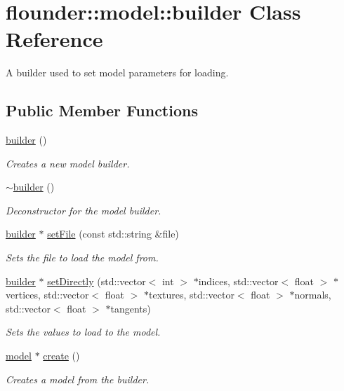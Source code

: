 \hypertarget{classflounder_1_1model_1_1builder}{}\section{flounder\+:\+:model\+:\+:builder Class Reference}
\label{classflounder_1_1model_1_1builder}


A builder used to set model parameters for loading.  


\subsection*{Public Member Functions}
\begin{DoxyCompactItemize}
\item 
\hyperlink{classflounder_1_1model_1_1builder_a54b8e2555e3227af7b0228993f27d25d}{builder} ()
\begin{DoxyCompactList}\small\item\em Creates a new model builder. \end{DoxyCompactList}\item 
\hyperlink{classflounder_1_1model_1_1builder_a638f3e963abefe6adf03f9b46651bb45}{$\sim$builder} ()
\begin{DoxyCompactList}\small\item\em Deconstructor for the model builder. \end{DoxyCompactList}\item 
\hyperlink{classflounder_1_1model_1_1builder}{builder} $\ast$ \hyperlink{classflounder_1_1model_1_1builder_a72cf78b032b9d680c8d51dea8a4cce70}{set\+File} (const std\+::string \&file)
\begin{DoxyCompactList}\small\item\em Sets the file to load the model from. \end{DoxyCompactList}\item 
\hyperlink{classflounder_1_1model_1_1builder}{builder} $\ast$ \hyperlink{classflounder_1_1model_1_1builder_ad85587080624eb2721b1c8fffc5fc008}{set\+Directly} (std\+::vector$<$ int $>$ $\ast$indices, std\+::vector$<$ float $>$ $\ast$vertices, std\+::vector$<$ float $>$ $\ast$textures, std\+::vector$<$ float $>$ $\ast$normals, std\+::vector$<$ float $>$ $\ast$tangents)
\begin{DoxyCompactList}\small\item\em Sets the values to load to the model. \end{DoxyCompactList}\item 
\hyperlink{classflounder_1_1model}{model} $\ast$ \hyperlink{classflounder_1_1model_1_1builder_a9809c3839db58e8b88ac6606e16f5401}{create} ()
\begin{DoxyCompactList}\small\item\em Creates a model from the builder. \end{DoxyCompactList}\end{DoxyCompactItemize}
